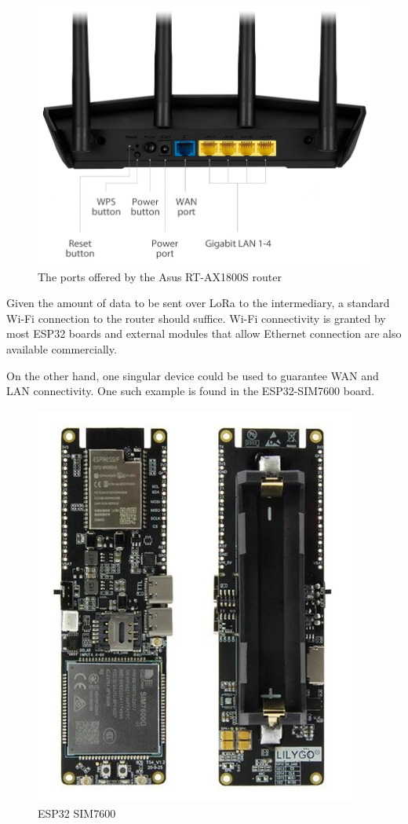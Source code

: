 \documentclass[11pt]{article}
\begin{document}
\begin{figure}[ht]
    \centering
    \includegraphics[scale = 0.2]{Asus RT-AX1800S Ports.png}
    \caption{The ports offered by the Asus RT-AX1800S router}
    \label{fig:Asus RT-AX1800S Ports}
\end{figure}

Given the amount of data to be sent over LoRa to the intermediary, a standard Wi-Fi connection to the router should suffice. Wi-Fi connectivity is granted by most ESP32 boards and external modules that allow Ethernet connection are also available commercially.\par \vspace{0.5 cm}


On the other hand, one singular device could be used to guarantee WAN and LAN connectivity. One such example is found in the ESP32-SIM7600 board. 
\begin{figure}[ht]
    \centering
    \includegraphics[scale = 0.2]{ESP32 SIM7600.png}
    \caption{ESP32 SIM7600}
    \label{fig:ESP32 SIM7600}
\end{figure}
\end{document}

